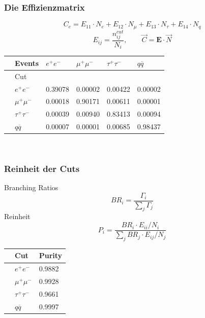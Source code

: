\begin{frame}
	\frametitle{Die Effizienzmatrix}
	\begin{equation*}
	C_e = E_{11} \cdot N_{e} + E_{12} \cdot N_\mu +E_{13} \cdot N_\tau+E_{14} \cdot N_q
	\end{equation*}
	\begin{equation*}
	E_{ij}=\frac{n^{cut}_{ij}}{N_i},\qquad \vec{C}=\boldsymbol{E}\cdot\vec{N}
	\end{equation*}
	\begin{table}[H]\centering
		\begin{tabular}{@{}llllll@{}}
			\toprule
			&Events &$e^+e^-$&$\mu^+\mu^-$&$\tau^+\tau^-$&$q\overline{q}$\\
			\midrule
			&Cut&&&&\\
			&$e^+e^-$&0.39078&0.00002&0.00422&0.00002\\
			&$\mu^+\mu^-$&0.00018&0.90171&0.00611&0.00001\\
			&$\tau^+\tau^-$&0.00039&0.00940&0.83413&0.00094\\
			&$q\overline{q}$&0.00007&0.00001&0.00685&0.98437\\
		\end{tabular}\\
		\noindent{}
	\end{table}
\end{frame}

\begin{frame}
	\frametitle{Reinheit der Cuts}
	\hspace{2cm} Branching Ratios
	\begin{equation*}
		BR_i=\frac{\Gamma_i}{\sum_{j}\Gamma_{j}}
	\end{equation*}
	\hspace{2cm} Reinheit
	\begin{equation*}
		P_i=\frac{BR_i\cdot E_{ii}/N_i}{\sum_{j}BR_j\cdot E_{ij}/N_j}
	\end{equation*}
	\begin{table}\centering
		\begin{tabular}{@{}lll@{}}
			\toprule
			&Cut&Purity\\
			\midrule
			&$e^+e^-$&0.9882\\
			&$\mu^+\mu^-$&0.9928\\
			&$\tau^+\tau^-$&0.9661\\
			&$q\overline{q}$&0.9997\\
			\bottomrule
		\end{tabular}
	\end{table}
\end{frame}

